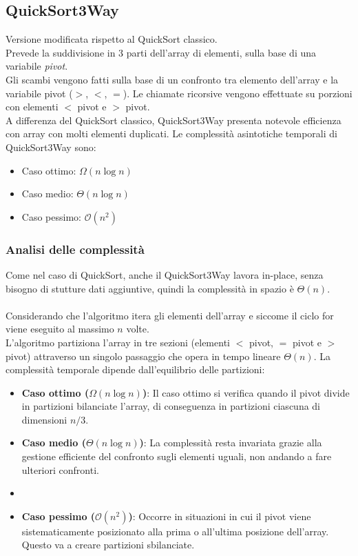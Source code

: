 \documentclass[a4paper, 11pt]{article}
\begin{document}
\subsection{QuickSort3Way}
Versione modificata rispetto al QuickSort classico.\\
Prevede la suddivisione in 3 parti dell'array di elementi, sulla base di una variabile \textit{pivot}.\\
Gli scambi vengono fatti sulla base di un confronto tra elemento dell'array e la variabile pivot ($>$, $<$, $=$). Le chiamate ricorsive vengono effettuate su porzioni con elementi $<$ pivot e $>$ pivot.\\
A differenza del QuickSort classico, QuickSort3Way presenta notevole efficienza con array con molti elementi duplicati.\bigbreak
Le complessità asintotiche temporali di QuickSort3Way sono:
\begin{itemize}
    \item Caso ottimo: $\Omega(n\log n)$
    \item Caso medio: $\Theta(n\log n)$
    \item Caso pessimo: $\mathcal{O}(n^2)$
\end{itemize}

\subsubsection{Analisi delle complessità}
Come nel caso di QuickSort, anche il QuickSort3Way lavora in-place, senza bisogno di stutture dati aggiuntive, quindi la complessità in spazio è $\Theta(n)$.\\\\
Considerando che l'algoritmo itera gli elementi dell'array e siccome il ciclo for viene eseguito al massimo $n$ volte.\\
L'algoritmo partiziona l'array in tre sezioni (elementi $<$ pivot, $=$ pivot e $>$ pivot) attraverso un singolo passaggio che opera in tempo lineare $\Theta(n)$. La complessità temporale dipende dall'equilibrio delle partizioni:
\begin{itemize}
    \item \textbf{Caso ottimo ($\Omega(n \log n)$)}: Il caso ottimo si verifica quando il pivot divide in partizioni bilanciate l'array, di conseguenza in partizioni ciascuna di dimensioni $n/3$.
    \item \textbf{Caso medio ($\Theta(n \log n)$)}: La complessità resta invariata grazie alla gestione efficiente del confronto sugli elementi uguali, non andando a fare ulteriori confronti.
    \item \item \textbf{Caso pessimo ($\mathcal{O}(n^2)$)}: Occorre in situazioni in cui il pivot viene sistematicamente posizionato alla prima o all'ultima posizione dell'array. Questo va a creare partizioni sbilanciate. 
\end{itemize}
\end{document}
